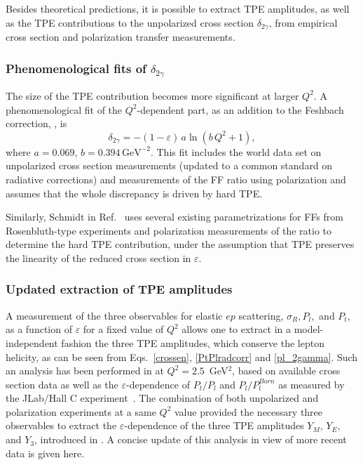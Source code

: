 Besides theoretical predictions, it is possible to extract TPE amplitudes, as well as the TPE contributions to the unpolarized cross section $\delta_{2\gamma}$,  from empirical cross section and polarization transfer measurements.

\subsubsection{Phenomenological fits of \texorpdfstring{$\delta_{2\gamma}$}{TEXT}}

The size of the TPE contribution becomes more significant at larger $Q^2$. A phenomenological fit of the $Q^2$-dependent part, as an addition to the Feshbach correction, , is \cite{A1:2013fsc} 
\begin{equation}
    \delta_{2 \gamma} =-(1-\varepsilon) \, a \ln (b\, Q^2+1),
\end{equation}
where $a=0.069, \,b=0.394\, \text{GeV}^{-2}$. This fit includes the world data set on unpolarized cross section measurements (updated to a common standard on radiative corrections) and measurements of the FF ratio using polarization and assumes that the whole discrepancy is driven by hard TPE.

Similarly, Schmidt in Ref.~\cite{Schmidt:2019vpr} uses several existing parametrizations for FFs from Rosenbluth-type experiments and polarization measurements of the ratio to determine the hard TPE contribution, under the assumption that TPE preserves the linearity of the reduced cross section in $\varepsilon$.

\subsubsection{Updated extraction of TPE amplitudes}

A measurement of the three observables for elastic $ep$ scattering, $\sigma_R, P_l,$ and $P_t$,  as a function of $\varepsilon$ for a fixed value of $Q^2$ allows one to extract in a model-independent fashion the three TPE amplitudes, which conserve the lepton helicity, as can be seen from Eqs.~\ref{crossen}, \ref{PtPlradcorr} and \ref{pl_2gamma}. Such an analysis has been performed in \cite{Guttmann:2010au} at $Q^2 = 2.5$~GeV$^2$, based on 
available cross section data as well as the $\varepsilon$-dependence of  
  $P_t/P_l$ and $P_l/P_l^{Born}$ 
  as measured by the JLab/Hall C experiment~\cite{GEp2gamma:2010gvp}. 
    The combination of both unpolarized and polarization experiments at a same $Q^2$ value 
provided the necessary three observables to extract the 
  $\varepsilon$-dependence of the three TPE amplitudes $Y_M$, $Y_E$, and $Y_3$, introduced in . A concise update of this analysis in view of more recent data is given here. 

